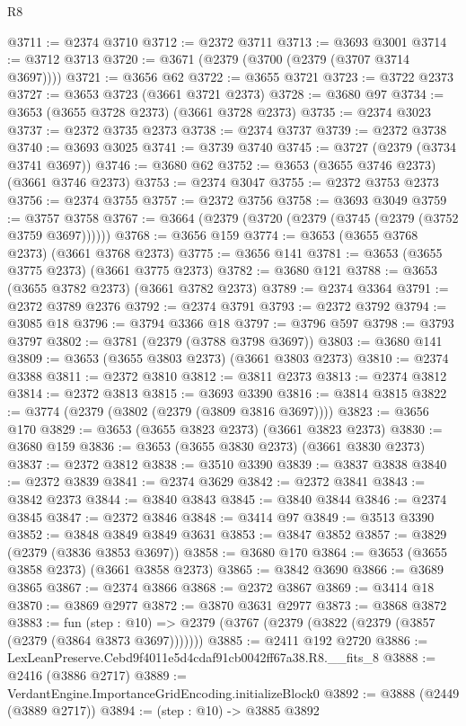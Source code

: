 \begin{lexlean}{R8}
\begin{coremodule}
@3711 := @2374 @3710
@3712 := @2372 @3711
@3713 := @3693 @3001
@3714 := @3712 @3713
@3720 := @3671 (@2379 (@3700 (@2379 (@3707 @3714 @3697))))
@3721 := @3656 @62
@3722 := @3655 @3721
@3723 := @3722 @2373
@3727 := @3653 @3723 (@3661 @3721 @2373)
@3728 := @3680 @97
@3734 := @3653 (@3655 @3728 @2373) (@3661 @3728 @2373)
@3735 := @2374 @3023
@3737 := @2372 @3735 @2373
@3738 := @2374 @3737
@3739 := @2372 @3738
@3740 := @3693 @3025
@3741 := @3739 @3740
@3745 := @3727 (@2379 (@3734 @3741 @3697))
@3746 := @3680 @62
@3752 := @3653 (@3655 @3746 @2373) (@3661 @3746 @2373)
@3753 := @2374 @3047
@3755 := @2372 @3753 @2373
@3756 := @2374 @3755
@3757 := @2372 @3756
@3758 := @3693 @3049
@3759 := @3757 @3758
@3767 := @3664 (@2379 (@3720 (@2379 (@3745 (@2379 (@3752 @3759 @3697))))))
@3768 := @3656 @159
@3774 := @3653 (@3655 @3768 @2373) (@3661 @3768 @2373)
@3775 := @3656 @141
@3781 := @3653 (@3655 @3775 @2373) (@3661 @3775 @2373)
@3782 := @3680 @121
@3788 := @3653 (@3655 @3782 @2373) (@3661 @3782 @2373)
@3789 := @2374 @3364
@3791 := @2372 @3789 @2376
@3792 := @2374 @3791
@3793 := @2372 @3792
@3794 := @3085 @18
@3796 := @3794 @3366 @18
@3797 := @3796 @597
@3798 := @3793 @3797
@3802 := @3781 (@2379 (@3788 @3798 @3697))
@3803 := @3680 @141
@3809 := @3653 (@3655 @3803 @2373) (@3661 @3803 @2373)
@3810 := @2374 @3388
@3811 := @2372 @3810
@3812 := @3811 @2373
@3813 := @2374 @3812
@3814 := @2372 @3813
@3815 := @3693 @3390
@3816 := @3814 @3815
@3822 := @3774 (@2379 (@3802 (@2379 (@3809 @3816 @3697))))
@3823 := @3656 @170
@3829 := @3653 (@3655 @3823 @2373) (@3661 @3823 @2373)
@3830 := @3680 @159
@3836 := @3653 (@3655 @3830 @2373) (@3661 @3830 @2373)
@3837 := @2372 @3812
@3838 := @3510 @3390
@3839 := @3837 @3838
@3840 := @2372 @3839
@3841 := @2374 @3629
@3842 := @2372 @3841
@3843 := @3842 @2373
@3844 := @3840 @3843
@3845 := @3840 @3844
@3846 := @2374 @3845
@3847 := @2372 @3846
@3848 := @3414 @97
@3849 := @3513 @3390
@3852 := @3848 @3849 @3849 @3631
@3853 := @3847 @3852
@3857 := @3829 (@2379 (@3836 @3853 @3697))
@3858 := @3680 @170
@3864 := @3653 (@3655 @3858 @2373) (@3661 @3858 @2373)
@3865 := @3842 @3690
@3866 := @3689 @3865
@3867 := @2374 @3866
@3868 := @2372 @3867
@3869 := @3414 @18
@3870 := @3869 @2977
@3872 := @3870 @3631 @2977
@3873 := @3868 @3872
@3883 := fun (step : @10) =>
  @2379 (@3767 (@2379 (@3822 (@2379 (@3857 (@2379 (@3864 @3873 @3697)))))))
@3885 := @2411 @192 @2720
@3886 := LexLeanPreserve.Cebd9f4011e5d4cdaf91cb0042ff67a38.R8.__fits_8
@3888 := @2416 (@3886 @2717)
@3889 := VerdantEngine.ImportanceGridEncoding.initializeBlock0
@3892 := @3888 (@2449 (@3889 @2717))
@3894 := (step : @10) -> @3885 @3892

\end{coremodule}
\end{lexlean}
